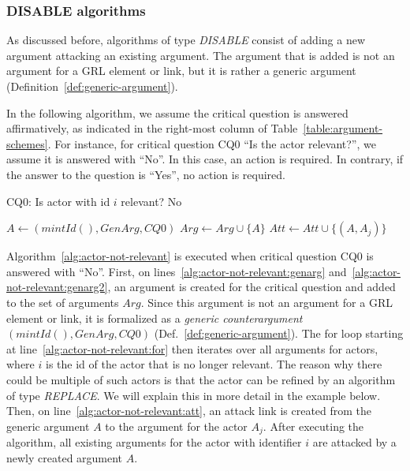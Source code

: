 \subsubsection{DISABLE algorithms}
\label{sect:formalframework:disable}
As discussed before, algorithms of type \emph{DISABLE} consist of adding a new argument attacking an existing argument. The argument that is added is not an argument for a GRL element or link, but it is rather a generic argument (Definition~\ref{def:generic-argument}).

In the following algorithm, we assume the critical question is answered affirmatively, as indicated in the right-most column of Table~\ref{table:argument-schemes}. For instance, for critical question CQ0 ``Is the actor relevant?'', we assume it is answered with ``No''. In this case, an action is required. In contrary, if the answer to the question is ``Yes'', no action is required.

\begin{algorithm}[h]
  \caption{CQ0: Is actor with id $i$ relevant? No}\label{alg:actor-not-relevant}
  \begin{algorithmic}[1]
    \State $A \leftarrow (mintId(),GenArg,CQ0)$\label{alg:actor-not-relevant:genarg}
    \State $Arg\leftarrow Arg \cup \{A\}$\label{alg:actor-not-relevant:genarg2}
    \label{alg:actor-not-relevant:for}
      \State $Att \leftarrow Att \cup \{(A,A_j)\}$\label{alg:actor-not-relevant:att}
    \EndFor
    \EndProcedure
  \end{algorithmic}
\end{algorithm}

Algorithm~\ref{alg:actor-not-relevant} is executed when critical question CQ0 is answered with ``No''. First, on lines~\ref{alg:actor-not-relevant:genarg} and~\ref{alg:actor-not-relevant:genarg2}, an argument is created for the critical question and added to the set of arguments $Arg$. Since this argument is not an argument for a GRL element or link, it is formalized as a \emph{generic counterargument} $(mintId(), GenArg, CQ0)$ (Def.~\ref{def:generic-argument}). The for loop starting at line~\ref{alg:actor-not-relevant:for} then iterates over all arguments for actors, where $i$ is the id of the actor that is no longer relevant. The reason why there could be multiple of such actors is that the actor can be refined by an algorithm of type \emph{REPLACE}. We will explain this in more detail in the example below. Then, on line~\ref{alg:actor-not-relevant:att}, an attack link is created from the generic argument $A$ to the argument for the actor $A_j$. After executing the algorithm, all existing arguments for the actor with identifier $i$ are attacked by a newly created argument $A$.

